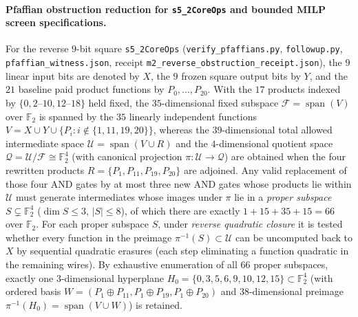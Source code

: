 \documentclass[11pt,a4paper]{article}
\theoremstyle{definition}
\theoremstyle{remark}
\begin{document}
\paragraph{Pfaffian obstruction reduction for \texttt{s5\_2CoreOps} and bounded MILP screen specifications.}
For the reverse \(9\)-bit square \texttt{s5\_2CoreOps} (\texttt{verify\_\allowbreak pfaffians.py}, \texttt{followup.py}, \texttt{pfaffian\_\allowbreak witness.json}, receipt \texttt{m2\_\allowbreak reverse\_\allowbreak obstruction\_\allowbreak receipt.json}), the \(9\) linear input bits are denoted by \(X\), the \(9\) frozen square output bits by \(Y\), and the \(21\) baseline paid product functions by \(P_0, \dots, P_{20}\). With the \(17\) products indexed by \(\{0, 2\text{--}10, 12\text{--}18\}\) held fixed, the \(35\)-dimensional fixed subspace \(\mathcal{F} = \operatorname{span}(V)\) over \(\mathbb{F}_2\) is spanned by the \(35\) linearly independent functions \(V = X \cup Y \cup \{P_i : i \notin \{1,11,19,20\}\}\), whereas the \(39\)-dimensional total allowed intermediate space \(\mathcal{U} = \operatorname{span}(V \cup R)\) and the \(4\)-dimensional quotient space \(\mathcal{Q} = \mathcal{U} / \mathcal{F} \cong \mathbb{F}_2^4\) (with canonical projection \(\pi : \mathcal{U} \to \mathcal{Q}\)) are obtained when the four rewritten products \(R = \{P_1, P_{11}, P_{19}, P_{20}\}\) are adjoined. Any valid replacement of those four AND gates by at most three new AND gates whose products lie within \(\mathcal{U}\) must generate intermediates whose images under \(\pi\) lie in a \emph{proper subspace} \(S \subsetneq \mathbb{F}_2^4\) (\(\dim S \le 3\), \(|S| \le 8\)), of which there are exactly \(1 + 15 + 35 + 15 = 66\) over \(\mathbb{F}_2\). For each proper subspace \(S\), under \emph{reverse quadratic closure} it is tested whether every function in the preimage \(\pi^{-1}(S) \subset \mathcal{U}\) can be uncomputed back to \(X\) by sequential quadratic erasures (each step eliminating a function quadratic in the remaining wires). By exhaustive enumeration of all \(66\) proper subspaces, exactly one \(3\)-dimensional hyperplane \(H_0 = \{0,3,5,6,9,10,12,15\} \subset \mathbb{F}_2^4\) (with ordered basis \(W = (P_1 \oplus P_{11}, P_1 \oplus P_{19}, P_1 \oplus P_{20})\) and \(38\)-dimensional preimage \(\pi^{-1}(H_0) = \operatorname{span}(V \cup W)\)) is retained.
\end{document}
